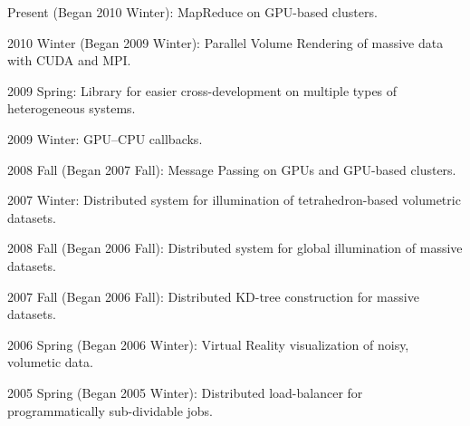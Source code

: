 Present (Began 2010 Winter): MapReduce on GPU-based clusters.

2010 Winter (Began 2009 Winter): Parallel Volume Rendering of massive data with CUDA and MPI.

2009 Spring: Library for easier cross-development on multiple types of heterogeneous systems.

2009 Winter: GPU--CPU callbacks.

2008 Fall (Began 2007 Fall): Message Passing on GPUs and GPU-based clusters.

2007 Winter: Distributed system for illumination of tetrahedron-based volumetric datasets.

2008 Fall (Began 2006 Fall): Distributed system for global illumination of massive datasets.

2007 Fall (Began 2006 Fall): Distributed KD-tree construction for massive datasets.

2006 Spring (Began 2006 Winter): Virtual Reality visualization of noisy, volumetic data.

2005 Spring (Began 2005 Winter): Distributed load-balancer for programmatically sub-dividable jobs.
